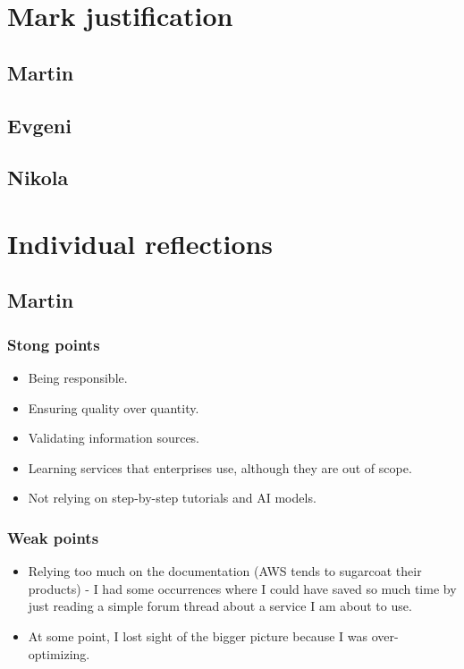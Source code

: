 \documentclass[10pt, a4paper]{article}
\begin{document}
\section{Mark justification}
\subsection{Martin}

\subsection{Evgeni}

\subsection{Nikola}

\section{Individual reflections}
\subsection{Martin}
\subsubsection{Stong points}
\begin{itemize}
	\item Being responsible.
	\item Ensuring quality over quantity.
	\item Validating information sources.
	\item Learning services that enterprises use, although they are out of scope.
	\item Not relying on step-by-step tutorials and AI models.
\end{itemize}


\subsubsection{Weak points}
\begin{itemize}
	\item Relying too much on the documentation (AWS tends to sugarcoat their products) - I had some occurrences where I could have saved so much time by just reading a simple forum thread about a service I am about to use.
	\item At some point, I lost sight of the bigger picture because I was over-optimizing.
\end{itemize}
\end{document}
